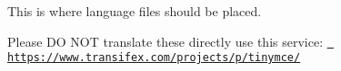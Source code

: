 This is where language files should be placed.

Please DO N\+OT translate these directly use this service\+: \href{https://www.transifex.com/projects/p/tinymce/}{\texttt{ https\+://www.\+transifex.\+com/projects/p/tinymce/}} 